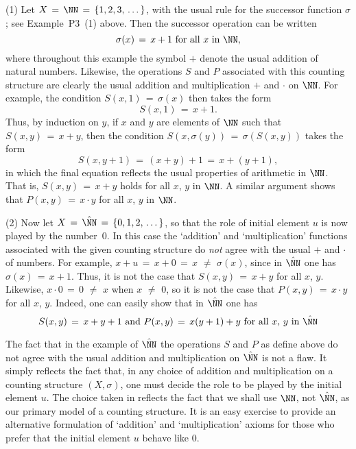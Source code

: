         (1) Let $X \,=\, {\NN} \,=\, \{1,2,3,\,{\ldots}\,\}$, with the usual rule for the successor function ${\sigma}$; see Example~P3~(1) above.
    Then the successor operation can be written
        \begin{displaymath}
        {\sigma}(x) \,=\, x+1 \mbox{ for all $x$ in ${\NN}$},
        \end{displaymath}
    where throughout this example the symbol $+$ denote the usual addition of natural numbers.
    Likewise, the operations $S$ and $P$ associated with this counting structure are clearly the usual addition and multiplication $+$ and ${\cdot}$ on ${\NN}$.
    For example, the condition $S(x,1) \,=\, {\sigma}(x)$ then takes the form
        \begin{displaymath}
        S(x,1) \,=\, x+1.
        \end{displaymath}
    Thus, by induction on $y$, if $x$ and $y$ are elements of ${\NN}$ such that $S(x,y) \,=\, x+y$,
then the condition $S(x,{\sigma}(y)) \,=\, {\sigma}\left(S(x,y)\right)$ takes the form
        \begin{displaymath}
        S(x,y+1) \,=\, (x+y)+1 \,=\, x+(y+1),
        \end{displaymath}
    in which the final equation reflects the usual properties of arithmetic in ${\NN}$.
    That is, $S(x,y) \,=\, x+y$ holds for all $x$, $y$  in ${\NN}$.
    A similar argument shows that $P(x,y) \,=\, x{\cdot}y$ for all $x$, $y$ in ${\NN}$.

\V

        (2) Now let $X \,=\, \hat{{\NN}} \,=\, \{0,1,2,\,{\ldots}\,\}$, so that the role of initial element $u$ is now played by the number~$0$.
    In this case the `addition' and `multiplication' functions associated with the given counting structure do {\em not} agree with the usual $+$ and ${\cdot}$ of numbers.
    For example, $x+u \,=\, x+0 \,=\, x \,\,{\neq}\,\, {\sigma}(x)$, since in $\hat{{\NN}}$ one has ${\sigma}(x) \,=\, x+1$.
    Thus, it is not the case that $S(x,y) \,=\, x+y$ for all $x$, $y$.
    Likewise, $x{\cdot}0 \,=\, 0 \,\,{\neq}\,\,x$ when $x \,\,{\neq}\,\, 0$,  so it is not the case that $P(x,y) \,=\, x{\cdot}y$ for all $x$, $y$.
    Indeed, one can easily show that in $\hat{{\NN}}$ one has
        \begin{displaymath}
        S(x,y) \,=\, x+y+1 \mbox{ and } P(x,y) \,=\, x(y+1) + y \mbox{ for all $x$, $y$ in $\hat{{\NN}}$}
        \end{displaymath}

        The fact that in the example of $\hat{{\NN}}$ the operations $S$ and $P$ as define above do not agree with the usual addition and multiplication on $\hat{{\NN}}$ is not a flaw.
    It simply reflects the fact that, in any choice of addition and multiplication on a counting structure $(X,{\sigma})$,
    one must decide the role to be played by the initial element $u$.
    The choice taken in {\TheseNotes} reflects the fact that we shall use ${\NN}$, not $\hat{{\NN}}$,
    as our primary model of a counting structure.
    It is an easy exercise to provide an alternative formulation of `addition'  and `multiplication' axioms for those who prefer that the initial element $u$ behave like $0$.

